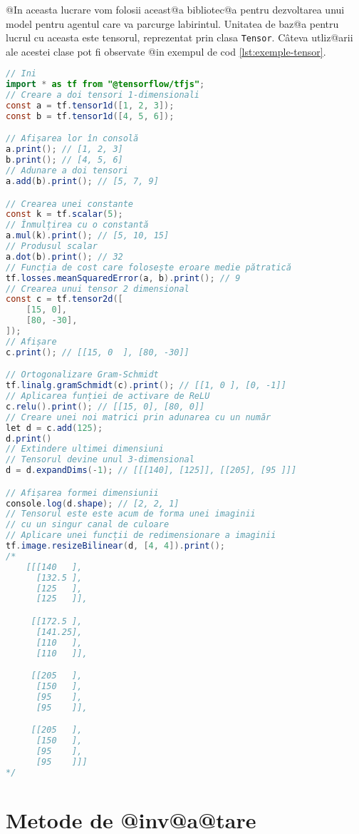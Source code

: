 @In aceasta lucrare vom folosii aceast@a bibliotec@a pentru dezvoltarea unui model pentru agentul care va parcurge labirintul. Unitatea de baz@a pentru lucrul cu aceasta este tensorul, reprezentat prin clasa \texttt{Tensor}. C\^ ateva utliz@arii ale acestei clase pot fi observate @in exempul de cod \ref{lst:exemple-tensor}.

\begin{lstlisting}[language=Java, caption=Exemple de folosire a bibliotecii Tensorflow, label={lst:exemple-tensor}]
// Ini	
import * as tf from "@tensorflow/tfjs";
// Creare a doi tensori 1-dimensionali
const a = tf.tensor1d([1, 2, 3]);
const b = tf.tensor1d([4, 5, 6]);

// Afișarea lor în consolă
a.print(); // [1, 2, 3]
b.print(); // [4, 5, 6]
// Adunare a doi tensori
a.add(b).print(); // [5, 7, 9]

// Crearea unei constante
const k = tf.scalar(5);
// Înmulțirea cu o constantă
a.mul(k).print(); // [5, 10, 15]
// Produsul scalar
a.dot(b).print(); // 32
// Funcția de cost care folosește eroare medie pătratică
tf.losses.meanSquaredError(a, b).print(); // 9
// Crearea unui tensor 2 dimensional
const c = tf.tensor2d([
    [15, 0],
    [80, -30],
]);
// Afișare
c.print(); // [[15, 0  ], [80, -30]]

// Ortogonalizare Gram-Schmidt
tf.linalg.gramSchmidt(c).print(); // [[1, 0 ], [0, -1]]
// Aplicarea funției de activare de ReLU
c.relu().print(); // [[15, 0], [80, 0]]
// Creare unei noi matrici prin adunarea cu un număr
let d = c.add(125);
d.print()
// Extindere ultimei dimensiuni
// Tensorul devine unul 3-dimensional
d = d.expandDims(-1); // [[[140], [125]], [[205], [95 ]]]

// Afișarea formei dimensiunii
console.log(d.shape); // [2, 2, 1]
// Tensorul este este acum de forma unei imaginii
// cu un singur canal de culoare
// Aplicare unei funcții de redimensionare a imaginii
tf.image.resizeBilinear(d, [4, 4]).print();
/*
    [[[140   ],
      [132.5 ],
      [125   ],
      [125   ]],

     [[172.5 ],
      [141.25],
      [110   ],
      [110   ]],

     [[205   ],
      [150   ],
      [95    ],
      [95    ]],

     [[205   ],
      [150   ],
      [95    ],
      [95    ]]]
*/	
\end{lstlisting}


\chapter{Metode de @inv@a@tare}

